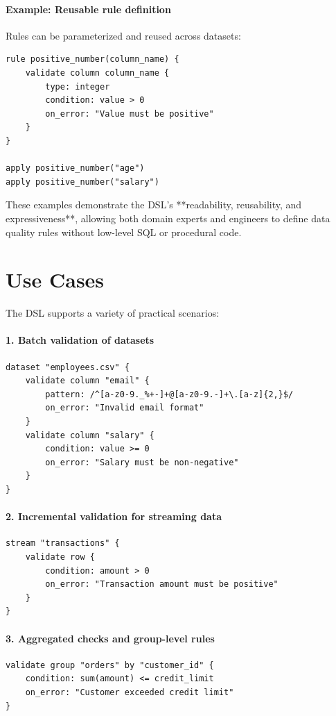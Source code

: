 \begin{itemize}[label=-, noitemsep]
\paragraph{Example: Reusable rule definition}
Rules can be parameterized and reused across datasets:

\begin{verbatim}
rule positive_number(column_name) {
    validate column column_name {
        type: integer
        condition: value > 0
        on_error: "Value must be positive"
    }
}

apply positive_number("age")
apply positive_number("salary")
\end{verbatim}

These examples demonstrate the DSL’s **readability, reusability, and expressiveness**, allowing both domain experts and engineers to define data quality rules without low-level SQL or procedural code.

\section{Use Cases}

The DSL supports a variety of practical scenarios:

\paragraph{1. Batch validation of datasets}
\begin{verbatim}
dataset "employees.csv" {
    validate column "email" {
        pattern: /^[a-z0-9._%+-]+@[a-z0-9.-]+\.[a-z]{2,}$/
        on_error: "Invalid email format"
    }
    validate column "salary" {
        condition: value >= 0
        on_error: "Salary must be non-negative"
    }
}
\end{verbatim}

\paragraph{2. Incremental validation for streaming data}
\begin{verbatim}
stream "transactions" {
    validate row {
        condition: amount > 0
        on_error: "Transaction amount must be positive"
    }
}
\end{verbatim}

\paragraph{3. Aggregated checks and group-level rules}
\begin{verbatim}
validate group "orders" by "customer_id" {
    condition: sum(amount) <= credit_limit
    on_error: "Customer exceeded credit limit"
}
\end{verbatim}


\end{itemize}
